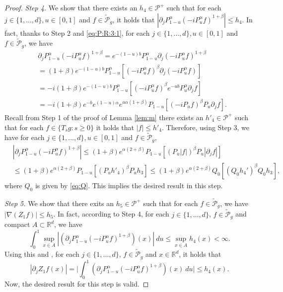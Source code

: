 \documentclass[12pt,a4paper]{amsart}
\theoremstyle{plain}
\theoremstyle{definition}
\numberwithin{equation}{section}
\begin{document}
\begin{proof}
  \emph{Step 4.} We show that there exists an $h_{4} \in \mathcal P^+$ such that for each $j \in \{1,\dots, d\}, u \in [0, 1]$ and $f \in \widetilde {\mathcal P}_g$, it holds that
  \(
    | \partial_j  P_{1-u}^\alpha (- i P_u^\alpha f)^{1+\beta} |
    \leq h_4.
  \) 
  In fact, thanks to Step 2 and \eqref{eq:P:R:3:1}, for each $j \in \{1,\dots, d\}, u \in [0, 1]$ and $f \in \widetilde{\mathcal P}_g$, we have
\begin{align}
  & \partial_j  P_{1-u}^\alpha (- i P_u^\alpha f)^{1+\beta}
  = e^{-(1-u)b} P_{1-u}^\alpha \partial_j (- i P_u^\alpha f)^{1+\beta}
  \\ & = (1+\beta) e^{-(1-u)b} P_{1-u}^\alpha [ (- i P_u^\alpha f)^\beta \partial_j (- i P_u^\alpha f) ]
  \\ & = -i(1+\beta) e^{-(1-u)b} P_{1-u}^\alpha[ (- i P_u^\alpha f)^\beta e^{-ub} P_u^\alpha \partial_j f] 
  \\ & = -i(1+\beta) e^{-b} e^{(1-u)\alpha} e^{u\alpha (1+\beta)} P_{1-u} [ (- i P_u f)^\beta P_u \partial_j f ].
\end{align}
Recall from Step 1 of the proof of Lemma \ref{lem:m} there exists an $h'_4\in \mathcal P^+$ such that for each $f \in \{T_sg:s\geq 0\}$ it holds that $|f| \leq h'_4$.
Therefore, using Step 3, we have for each $j \in \{1,\dots, d\}, u \in [0, 1]$ and $f \in \widetilde {\mathcal P}_g$, 
\begin{align}
  & |\partial_j  P_{1-u}^\alpha (- i P_u^\alpha f)^{1+\beta}|
  \leq (1+\beta) e^{\alpha (2+\beta)} P_{1-u} [  (P_u |f|)^\beta P_u |\partial_j f| ] 
\\&    \leq (1+\beta) e^{\alpha (2+\beta)} P_{1-u} [  (P_u h'_4)^\beta P_u h_3 ] 
   \leq (1+\beta) e^{\alpha (2+\beta)} Q_0 [  (Q_0 h_4')^\beta Q_0 h_3 ], 
\end{align}
where $Q_0$ is given by \eqref{eq:Q}. 
This implies the desired result in this step.

 \emph{Step 5.} We show that there exits an $h_5 \in \mathcal P^+$ such that for each $f \in \widetilde {\mathcal P}_g$, we have $ |\nabla (Z_1f)| \leq h_5$.
In fact, according to Step 4, for each $j \in \{1,\dots, d\}$, $f \in \widetilde{\mathcal P}_g$ and compact $A \subset \mathbb R^d$, we have 
\[
  \int_0^1 \sup_{x\in A} | (\partial_j  P_{1-u}^\alpha (-i P_u^\alpha f)^{1+\beta}) (x) |~du 
  \leq \sup_{x\in A} h_4(x) < \infty.
\]
Using this and \cite[Theorem A.5.2]{Durrett2010Probability}, for each $j \in 
\{1,\dots, d\}$, $f\in \widetilde {\mathcal P}_g$ and $x\in \mathbb R^d$, it holds that
\[
  | \partial_j Z_1 f(x)| 
  =\Big| \int_0^1  ( \partial_jP_{1-u}^\alpha (-iP_u^\alpha f)^{1+\beta} ) (x) ~du  \Big| 
  \leq h_4(x).
\]
Now, the desired result for this step is valid. 


\end{proof}
\end{document}
